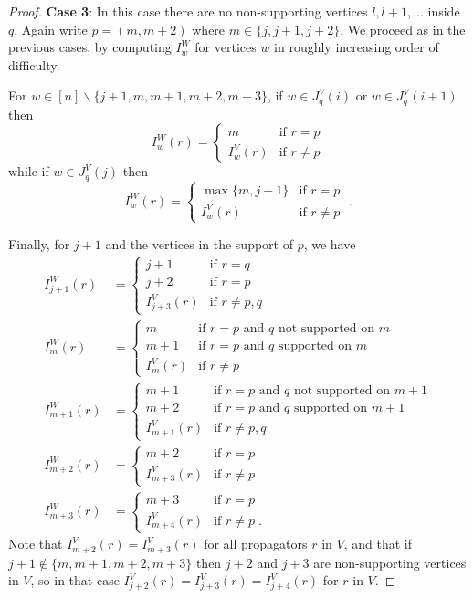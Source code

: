 \documentclass[11pt]{article}
\theoremstyle{remark}
\theoremstyle{definition}
\begin{document}
\begin{proof}
\textbf{Case 3}: In this case there are no non-supporting vertices $l, l+1, \ldots$ inside $q$.  Again write ${p=(m, m+2)}$ where $m\in \{j, j+1, j+2\}$. We proceed as in the previous cases, by computing $I^{W}_w$ for vertices $w$ in roughly increasing order of difficulty.

For $w \in [n]\backslash\{j+1,m,m+1,m+2,m+3\}$, if $w\in J_q^{V}(i)$ or $w\in J_q^{V}(i+1)$ then
    \[
    I_w^{W}(r) =  \begin{cases}
        m & \text{if } r=p \\
        I_{w}^{V}(r) & \text{if } r\neq p
      \end{cases} 
    \]
    while if $w\in J_q^{V}(j)$ then
    \[
    I_w^{W}(r) =  \begin{cases}
        \max\{m, j+1\} & \text{if } r=p \\
        I_{w}^{V}(r) & \text{if } r\neq p
      \end{cases} \;.
    \]

Finally, for $j+1$ and the vertices in the support of $p$, we have
\begin{align*}
  I_{j+1}^{W}(r) &= \begin{cases}
    j+1 & \text{if } r=q\\
    j+2 & \text{if } r=p\\
    I_{j+3}^{V}(r) & \text{if } r\neq p,q
  \end{cases}\\
  I_m^{W}(r) &= \begin{cases}
    m & \text{if $r=p$ and $q$ not supported on $m$}\\
    m+1 & \text{if $r=p$ and $q$ supported on $m$}\\
    I_{m}^{V}(r) & \text{if } r\neq p
  \end{cases}\\
  I_{m+1}^{W}(r) & = \begin{cases}
    m+1 & \text{if $r=p$ and $q$ not supported on $m+1$} \\
    m+2 & \text{if $r=p$ and $q$ supported on $m+1$} \\
    I_{m+1}^{V}(r) & \text{if } r\neq p,q
  \end{cases}\\
  I_{m+2}^{W}(r) & = \begin{cases}
    m+2 & \text{if } r=p \\
    I_{m+3}^{V}(r) & \text{if } r\neq p
  \end{cases}\\
  I_{m+3}^{W}(r) & = \begin{cases}
    m+3 & \text{if } r=p \\
    I_{m+4}^{V}(r) & \text{if } r\neq p \; .
  \end{cases} 
\end{align*}
Note that $I_{m+2}^{V}(r) = I_{m+3}^{V}(r)$ for all propagators $r$ in $V$, and that if $j+1\not\in\{m, m+1, m+2, m+3\}$ then $j+2$ and $j+3$ are non-supporting vertices in $V$, so in that case $I_{j+2}^{V}(r) = I_{j+3}^{V}(r) = I_{j+4}^{V}(r)$ for $r$ in $V$. 


\end{proof}
\end{document}
